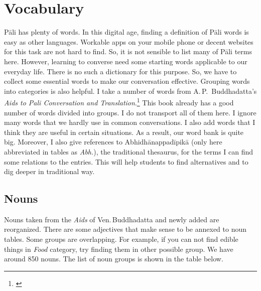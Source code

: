 \chapter{Vocabulary}\label{chap:vocab}

P\=ali has plenty of words. In this digital age, finding a definition of P\=ali words is easy as other languages. Workable apps on your mobile phone or decent websites for this task are not hard to find. So, it is not sensible to list many of P\=ali terms here. However, learning to converse need some starting words applicable to our everyday life. There is no such a dictionary for this purpose. So, we have to collect some essential words to make our conversation effective. Grouping words into categories is also helpful. I take a number of words from A.\,P.\, Buddhadatta's \emph{Aids to Pali Conversation and Translation}.\footnote{\citealp{buddhadatta:aids}} This book already has a good number of words divided into groups. I do not transport all of them here. I ignore many words that we hardly use in common conversations. I also add words that I think they are useful in certain situations. As a result, our word bank is quite big. Moreover, I also give references to Abhidh\=anappad\=ipik\=a (only here abbreviated in tables as \emph{Abh.}), the traditional thesaurus, for the terms I can find some relations to the entries. This will help students to find alternatives and to dig deeper in traditional way.

\section{Nouns}\label{vocab:noun}
Nouns taken from the \emph{Aids} of Ven.\,Buddhadatta and newly added are reorganized. There are some adjectives that make sense to be annexed to noun tables. Some groups are overlapping. For example, if you can not find edible things in \emph{Food} category, try finding them in other possible group. We have around 850 nouns. The list of noun groups is shown in the table below.

